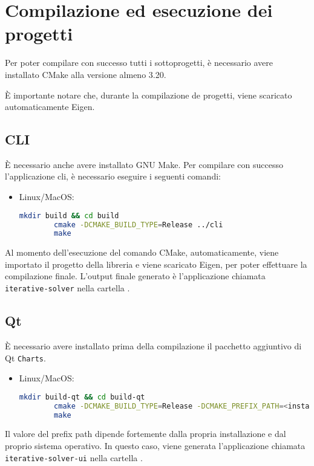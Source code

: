 	\appendix
\section{Compilazione ed esecuzione dei progetti}
Per poter compilare con successo tutti i sottoprogetti, è necessario avere installato CMake alla versione almeno 3.20.

È importante notare che, durante la compilazione de progetti, viene scaricato automaticamente Eigen.

\subsection{CLI}
È necessario anche avere installato GNU Make.
Per compilare con successo l'applicazione cli, è necessario eseguire i seguenti comandi:
\begin{itemize}
	\item Linux/MacOS: 
	\begin{lstlisting}[language=Bash]
		mkdir build && cd build
		cmake -DCMAKE_BUILD_TYPE=Release ../cli
		make \end{lstlisting}
\end{itemize}


Al momento dell'esecuzione del comando CMake, automaticamente, viene importato il progetto della libreria e viene scaricato Eigen, per poter effettuare la compilazione finale. L'output finale generato è l'applicazione chiamata \texttt{iterative-solver} nella cartella .

\subsection{Qt}
È necessario avere installato prima della compilazione il pacchetto aggiuntivo di Qt \texttt{Charts}.
\begin{itemize}
	\item Linux/MacOS: 
	\begin{lstlisting}[language=Bash]
		mkdir build-qt && cd build-qt
		cmake -DCMAKE_BUILD_TYPE=Release -DCMAKE_PREFIX_PATH=<installazione di Qt>/<versione>/<sistema> ../QTInterface
		make \end{lstlisting}
\end{itemize}
Il valore del prefix path dipende fortemente dalla propria installazione e dal proprio sistema operativo. In questo caso, viene generata l'applicazione chiamata \texttt{iterative-solver-ui} nella cartella .